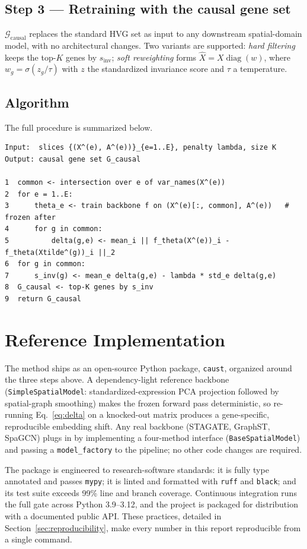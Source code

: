 \documentclass[11pt]{article}
\newcommand{\dinv}{s_{\mathrm{inv}}}
\newcommand{\Gcausal}{\mathcal{G}_{\text{causal}}}
\begin{document}
\subsection{Step 3 --- Retraining with the causal gene set}
$\Gcausal$ replaces the standard HVG set as input to any downstream
spatial-domain model, with no architectural changes. Two variants are supported:
\emph{hard filtering} keeps the top-$K$ genes by $\dinv$; \emph{soft reweighting}
forms $\hat{X} = X \operatorname{diag}(w)$, where $w_g = \sigma(z_g / \tau)$ with
$z$ the standardized invariance score and $\tau$ a temperature.

\subsection{Algorithm}
The full procedure is summarized below.

\begin{lstlisting}[caption={CauST causal gene selection.},label={lst:algo}]
Input:  slices {(X^(e), A^(e))}_{e=1..E}, penalty lambda, size K
Output: causal gene set G_causal

1  common <- intersection over e of var_names(X^(e))
2  for e = 1..E:
3      theta_e <- train backbone f on (X^(e)[:, common], A^(e))   # frozen after
4      for g in common:
5          delta(g,e) <- mean_i || f_theta(X^(e))_i - f_theta(Xtilde^(g))_i ||_2
6  for g in common:
7      s_inv(g) <- mean_e delta(g,e) - lambda * std_e delta(g,e)
8  G_causal <- top-K genes by s_inv
9  return G_causal
\end{lstlisting}

\section{Reference Implementation}
\label{sec:implementation}

The method ships as an open-source Python package, \texttt{caust}, organized
around the three steps above. A dependency-light reference backbone
(\texttt{SimpleSpatialModel}: standardized-expression PCA projection followed by
spatial-graph smoothing) makes the frozen forward pass deterministic, so
re-running Eq.~\eqref{eq:delta} on a knocked-out matrix produces a
gene-specific, reproducible embedding shift. Any real backbone (STAGATE,
GraphST, SpaGCN) plugs in by implementing a four-method interface
(\texttt{BaseSpatialModel}) and passing a \texttt{model\_factory} to the
pipeline; no other code changes are required.

The package is engineered to research-software standards: it is fully type
annotated and passes \texttt{mypy}; it is linted and formatted with \texttt{ruff}
and \texttt{black}; and its test suite exceeds 99\% line and branch coverage.
Continuous integration runs the full gate across Python 3.9--3.12, and the
project is packaged for distribution with a documented public API. These
practices, detailed in Section~\ref{sec:reproducibility}, make every number in
this report reproducible from a single command.
\end{document}
